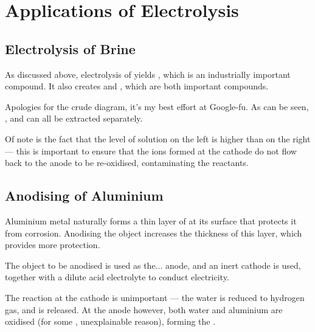 




	\pagebreak
	\section{Applications of Electrolysis}

		\subsection{Electrolysis of Brine}

			As discussed above, electrolysis of   yields , which is an industrially
			important compound. It also creates  and , which are both important compounds.


			Apologies for the crude diagram, it's my best effort at Google-fu. As can be seen, ,  and
			 can all be extracted separately.

			Of note is the fact that the level of solution on the left is higher than on the right --- this is important to ensure that
			the  ions formed at the cathode do not flow back to the anode to be re-oxidised, contaminating the reactants.




		\subsection{Anodising of Aluminium}

			Aluminium metal naturally forms a thin layer of  at its surface that protects it from corrosion. Anodising the object
			increases the thickness of this layer, which provides more protection.

			The object to be anodised is used as the... anode, and an inert cathode is used, together with a dilute acid electrolyte to conduct
			electricity.

			The reaction at the cathode is unimportant --- the water is reduced to hydrogen gas, and is released. At the anode however,
			both water and aluminium are oxidised (for some , unexplainable reason), forming the .


